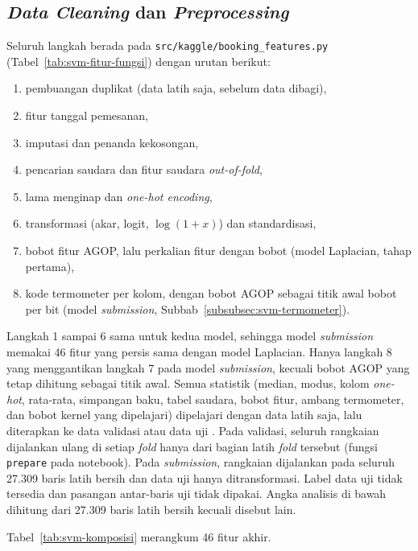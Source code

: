 \subsection{\textit{Data Cleaning} dan \textit{Preprocessing}}
\label{subsec:svm-preprocessing}

Seluruh langkah berada pada \nolinkurl{src/kaggle/booking_features.py} (Tabel~\ref{tab:svm-fitur-fungsi}) dengan urutan berikut:
\begin{enumerate}
	\item pembuangan duplikat (data latih saja, sebelum data dibagi),
	\item fitur tanggal pemesanan,
	\item imputasi dan penanda kekosongan,
	\item pencarian saudara dan fitur saudara \textit{out-of-fold},
	\item lama menginap dan \textit{one-hot encoding},
	\item transformasi (akar, logit, $\log(1+x)$) dan standardisasi,
	\item bobot fitur AGOP, lalu perkalian fitur dengan bobot (model Laplacian, tahap pertama),
	\item kode termometer per kolom, dengan bobot AGOP sebagai titik awal bobot per bit (model \textit{submission}, Subbab~\ref{subsubsec:svm-termometer}).
\end{enumerate}
Langkah 1 sampai 6 sama untuk kedua model, sehingga model \textit{submission} memakai 46 fitur yang persis sama dengan model Laplacian. Hanya langkah 8 yang menggantikan langkah 7 pada model \textit{submission}, kecuali bobot AGOP yang tetap dihitung sebagai titik awal.
Semua statistik (median, modus, kolom \textit{one-hot}, rata-rata, simpangan baku, tabel saudara, bobot fitur, ambang termometer, dan bobot kernel yang dipelajari) dipelajari dengan data latih saja, lalu diterapkan ke data validasi atau data uji \cite{slide-dataprep}. Pada validasi, seluruh rangkaian dijalankan ulang di setiap \textit{fold} hanya dari bagian latih \textit{fold} tersebut (fungsi \texttt{prepare} pada notebook). Pada \textit{submission}, rangkaian dijalankan pada seluruh 27.309 baris latih bersih dan data uji hanya ditransformasi. Label data uji tidak tersedia dan pasangan antar-baris uji tidak dipakai. Angka analisis di bawah dihitung dari 27.309 baris latih bersih kecuali disebut lain.

Tabel~\ref{tab:svm-komposisi} merangkum 46 fitur akhir.


